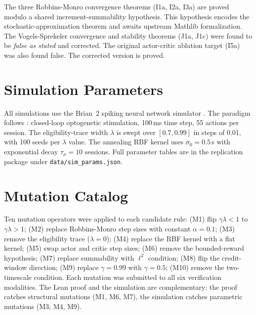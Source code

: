The three Robbins-Monro convergence theorems (I1a, I2a, I3a) are
proved modulo a shared increment-summability hypothesis. This hypothesis
encodes the stochastic-approximation theorem and awaits upstream
Mathlib formalization. The Vogels-Sprekeler convergence and
stability theorems (J1a, J1c) were found to be \emph{false as stated}
and corrected. The original actor-critic ablation target (I5a) was
also found false. The corrected version is proved.

\section{Simulation Parameters}
\label{app:sim-params}

All simulations use the Brian~2 spiking neural network simulator
\citep{stimberg2019brian2}. The paradigm follows \citet{tang2024dynamic}:
closed-loop optogenetic stimulation, 100\,ms time step, 55 actions
per session. The eligibility-trace width $\lambda$ is swept over
$[0.7, 0.99]$ in steps of 0.01, with 100 seeds per $\lambda$ value.
The annealing RBF kernel uses $\sigma_0 = 0.5$\,s with exponential
decay $\tau_\sigma = 10$ sessions. Full parameter tables are in the
replication package under \texttt{data/sim\_params.json}.

\section{Mutation Catalog}
\label{app:mutations}

Ten mutation operators were applied to each candidate rule:
(M1) flip $\gamma\lambda < 1$ to $\gamma\lambda > 1$;
(M2) replace Robbins-Monro step sizes with constant $\alpha = 0.1$;
(M3) remove the eligibility trace ($\lambda = 0$);
(M4) replace the RBF kernel with a flat kernel;
(M5) swap actor and critic step sizes;
(M6) remove the bounded-reward hypothesis;
(M7) replace summability with $\ell^2$ condition;
(M8) flip the credit-window direction;
(M9) replace $\gamma = 0.99$ with $\gamma = 0.5$;
(M10) remove the two-timescale condition.
Each mutation was submitted to all six verification modalities.
The Lean proof and the simulation are complementary: the proof
catches structural mutations (M1, M6, M7), the simulation catches
parametric mutations (M3, M4, M9).
